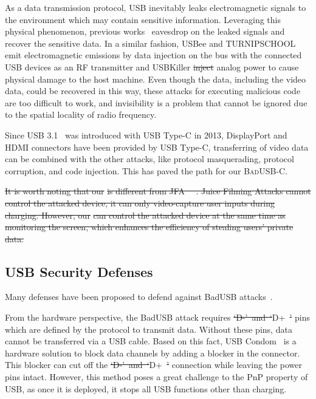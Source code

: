 \documentclass[conference]{IEEEtran}
\newcommand{\tool}{\mbox{\textsc{BadUSB-C}}\xspace}
\providecommand{\DIFaddtex}[1]{{\protect\color{blue}\uwave{#1}}} %
\providecommand{\DIFdeltex}[1]{{\protect\color{red}\sout{#1}}}                      %
\providecommand{\DIFaddbegin}{} %
\providecommand{\DIFaddend}{} %
\providecommand{\DIFdelbegin}{} %
\providecommand{\DIFdelend}{} %
\providecommand{\DIFadd}[1]{\texorpdfstring{\DIFaddtex{#1}}{#1}} %
\providecommand{\DIFdel}[1]{\texorpdfstring{\DIFdeltex{#1}}{}} %
\newcommand{\DIFscaledelfig}{0.5}
\newlength{\DIFdelgraphicswidth} %
\newlength{\DIFdelgraphicsheight} %
\newcommand{\DIFaddincludegraphics}[2][]{{\color{blue}\fbox{\DIFOincludegraphics[#1]{#2}}}} %
\newcommand{\DIFdelincludegraphics}[2][]{%
\sbox{\DIFdelgraphicsbox}{\DIFOincludegraphics[#1]{#2}}%
\settoboxwidth{\DIFdelgraphicswidth}{\DIFdelgraphicsbox} %
\settoboxtotalheight{\DIFdelgraphicsheight}{\DIFdelgraphicsbox} %
\scalebox{\DIFscaledelfig}{%
\parbox[b]{\DIFdelgraphicswidth}{\usebox{\DIFdelgraphicsbox}\\[-\baselineskip] \rule{\DIFdelgraphicswidth}{0em}}\llap{\resizebox{\DIFdelgraphicswidth}{\DIFdelgraphicsheight}{%
\setlength{\unitlength}{\DIFdelgraphicswidth}%
\begin{picture}(1,1)%
\thicklines\linethickness{2pt} %
{\color[rgb]{1,0,0}\put(0,0){\framebox(1,1){}}}%
{\color[rgb]{1,0,0}\put(0,0){\line( 1,1){1}}}%
{\color[rgb]{1,0,0}\put(0,1){\line(1,-1){1}}}%
\end{picture}%
}\hspace*{3pt}}} %
} %
\DeclareRobustCommand{\DIFaddbegin}{\DIFOaddbegin \let\includegraphics\DIFaddincludegraphics} %
\DeclareRobustCommand{\DIFaddend}{\DIFOaddend \let\includegraphics\DIFOincludegraphics} %
\DeclareRobustCommand{\DIFdelbegin}{\DIFOdelbegin \let\includegraphics\DIFdelincludegraphics} %
\DeclareRobustCommand{\DIFdelend}{\DIFOaddend \let\includegraphics\DIFOincludegraphics} %
\begin{document}
As a data transmission protocol, \ac{USB} inevitably leaks electromagnetic signals
to the environment which may contain sensitive information. Leveraging this
physical phenomenon, previous works~\cite{smartphone,
poweremi,revealing,su2017usb,usbgpslocator,bates2014leveraging,badusbhub,usbfinger,side,usbdriver}
eavesdrop on the leaked signals and recover the sensitive data. In a similar fashion, USBee\cite{usbee} and TURNIPSCHOOL\cite{turnip} emit electromagnetic emissions by data injection on the bus
with the connected \ac{USB} devices as an RF transmitter and USBKiller\cite{usbkiller}
\DIFdelbegin \DIFdel{inject }\DIFdelend \DIFaddbegin \DIFadd{injects }\DIFaddend analog
power to cause physical damage to the host machine. Even though the data,
including the video data, could be recovered in this way, these attacks for
executing malicious code are too difficult to work, and invisibility is a
problem that cannot be ignored due to the spatial locality of radio frequency.

Since \ac{USB} 3.1~\cite{usb31} was introduced with \ac{USB} Type-C in 2013, DisplayPort and HDMI
connectors have been provided by \ac{USB} Type-C, transferring of video data can be
combined with the other attacks, like protocol masquerading,  protocol
corruption, and code injection. This has paved the path for our \tool.

\DIFdelbegin \DIFdel{It is worth noting that our }%
\DIFdel{is different from JFA~\mbox{%
\cite{JFC}}\hspace{0pt}%
. Juice Filming Attacks cannot control the attacked device, it can only video-capture user inputs during charging. However, our }%
\DIFdel{can control the attacked device at the same time as monitoring the screen, which enhances the efficiency of stealing users' private data. 
}%

\DIFdelend \subsection{USB Security Defenses}
\label{subsec:usb_defence}

Many defenses have been proposed to defend against BadUSB attacks~\cite{sok}.

From the hardware perspective, the BadUSB attack requires \mbox{\DIFdelbegin \DIFdel{`D-' and `}\DIFdelend \DIFaddbegin \DIFadd{(}\DIFaddend D+ \DIFdelbegin \DIFdel{'}\DIFdelend \DIFaddbegin \DIFadd{\& D-)}\DIFaddend } pins which
are defined by the protocol to transmit data. Without these pins, data cannot 
be transferred via a \ac{USB} cable. Based
on this fact, \ac{USB} Condom~\cite{Condom} is a hardware solution to block data
channels by adding a blocker in the connector. This blocker can cut off the \mbox{\DIFdelbegin \DIFdel{`D-' and `}\DIFdelend \DIFaddbegin \DIFadd{(}\DIFaddend D+ \DIFdelbegin \DIFdel{'}\DIFdelend \DIFaddbegin \DIFadd{\& D-)}\DIFaddend } connection while leaving the power pins intact. However, this method poses
a great challenge to the \ac{PnP} property of \ac{USB}, as once it is deployed, it
stops all \ac{USB} functions other than charging.
\end{document}
